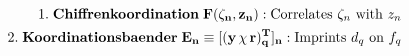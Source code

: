 \documentclass[preview]{standalone}
\begin{document}
\begin{align*}
\special{dvisvgm:raw <g id='unique000'>}1.\;\mathbf{Chiffrenkoordination\;F(\zeta_n, z_n):}\;\text{Correlates }\zeta_n\text{ with }z_n\\2.\;\mathbf{Koordinationsbaender\;E_n\equiv[(y\,\chi\,r)_q^T]_n:}\;\text{Imprints }d_q\text{ on }f_q\special{dvisvgm:raw </g>}
\end{align*}
\end{document}
